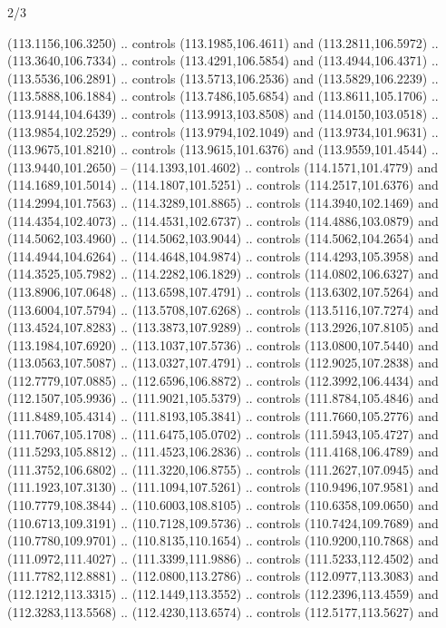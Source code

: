 \begin{flagdescription}{2/3}
\begin{scope}[shift={(0.5\flaglength,0.5)},scale=\flagwidth/320]
\begin{scope}[y=0.8pt, x=0.8pt, yscale=-1,shift={(-118.3,-146)}]
  (113.1156,106.3250) .. controls (113.1985,106.4611) and (113.2811,106.5972) ..
  (113.3640,106.7334) .. controls (113.4291,106.5854) and (113.4944,106.4371) ..
  (113.5536,106.2891) .. controls (113.5713,106.2536) and (113.5829,106.2239) ..
  (113.5888,106.1884) .. controls (113.7486,105.6854) and (113.8611,105.1706) ..
  (113.9144,104.6439) .. controls (113.9913,103.8508) and (114.0150,103.0518) ..
  (113.9854,102.2529) .. controls (113.9794,102.1049) and (113.9734,101.9631) ..
  (113.9675,101.8210) .. controls (113.9615,101.6376) and (113.9559,101.4544) ..
  (113.9440,101.2650) -- (114.1393,101.4602) .. controls (114.1571,101.4779) and
  (114.1689,101.5014) .. (114.1807,101.5251) .. controls (114.2517,101.6376) and
  (114.2994,101.7563) .. (114.3289,101.8865) .. controls (114.3940,102.1469) and
  (114.4354,102.4073) .. (114.4531,102.6737) .. controls (114.4886,103.0879) and
  (114.5062,103.4960) .. (114.5062,103.9044) .. controls (114.5062,104.2654) and
  (114.4944,104.6264) .. (114.4648,104.9874) .. controls (114.4293,105.3958) and
  (114.3525,105.7982) .. (114.2282,106.1829) .. controls (114.0802,106.6327) and
  (113.8906,107.0648) .. (113.6598,107.4791) .. controls (113.6302,107.5264) and
  (113.6004,107.5794) .. (113.5708,107.6268) .. controls (113.5116,107.7274) and
  (113.4524,107.8283) .. (113.3873,107.9289) .. controls (113.2926,107.8105) and
  (113.1984,107.6920) .. (113.1037,107.5736) .. controls (113.0800,107.5440) and
  (113.0563,107.5087) .. (113.0327,107.4791) .. controls (112.9025,107.2838) and
  (112.7779,107.0885) .. (112.6596,106.8872) .. controls (112.3992,106.4434) and
  (112.1507,105.9936) .. (111.9021,105.5379) .. controls (111.8784,105.4846) and
  (111.8489,105.4314) .. (111.8193,105.3841) .. controls (111.7660,105.2776) and
  (111.7067,105.1708) .. (111.6475,105.0702) .. controls (111.5943,105.4727) and
  (111.5293,105.8812) .. (111.4523,106.2836) .. controls (111.4168,106.4789) and
  (111.3752,106.6802) .. (111.3220,106.8755) .. controls (111.2627,107.0945) and
  (111.1923,107.3130) .. (111.1094,107.5261) .. controls (110.9496,107.9581) and
  (110.7779,108.3844) .. (110.6003,108.8105) .. controls (110.6358,109.0650) and
  (110.6713,109.3191) .. (110.7128,109.5736) .. controls (110.7424,109.7689) and
  (110.7780,109.9701) .. (110.8135,110.1654) .. controls (110.9200,110.7868) and
  (111.0972,111.4027) .. (111.3399,111.9886) .. controls (111.5233,112.4502) and
  (111.7782,112.8881) .. (112.0800,113.2786) .. controls (112.0977,113.3083) and
  (112.1212,113.3315) .. (112.1449,113.3552) .. controls (112.2396,113.4559) and
  (112.3283,113.5568) .. (112.4230,113.6574) .. controls (112.5177,113.5627) and

\end{scope}
\end{scope}
\end{flagdescription}
